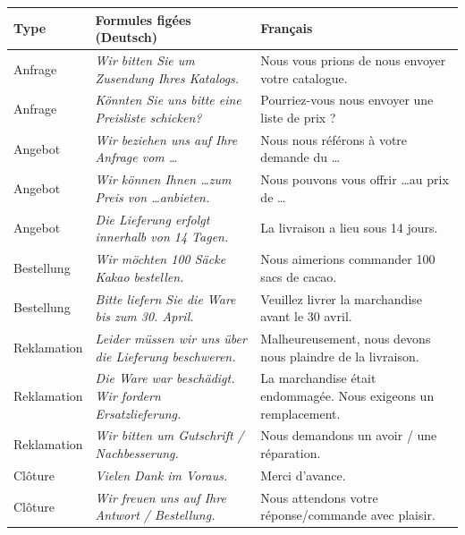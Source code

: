 \documentclass[11pt]{article}
\newcommand{\all}[1]{\ifmmode\text{\textit{#1}}\else\begingroup\selectlanguage{ngerman}\itshape #1\endgroup\fi}
\begin{document}
\begin{center}
\begin{tabularx}{\linewidth}{|l|X|X|}
\hline
\rowcolor{popblueL} \textbf{Type} & \textbf{Formules figées (Deutsch)} & \textbf{Français} \\
\hline
Anfrage & \all{Wir bitten Sie um Zusendung Ihres Katalogs.} & Nous vous prions de nous envoyer votre catalogue. \\
\hline
Anfrage & \all{Könnten Sie uns bitte eine Preisliste schicken?} & Pourriez-vous nous envoyer une liste de prix ? \\
\hline
Angebot & \all{Wir beziehen uns auf Ihre Anfrage vom \dots} & Nous nous référons à votre demande du \dots \\
\hline
Angebot & \all{Wir können Ihnen \dots zum Preis von \dots anbieten.} & Nous pouvons vous offrir \dots au prix de \dots \\
\hline
Angebot & \all{Die Lieferung erfolgt innerhalb von 14 Tagen.} & La livraison a lieu sous 14 jours. \\
\hline
Bestellung & \all{Wir möchten 100 Säcke Kakao bestellen.} & Nous aimerions commander 100 sacs de cacao. \\
\hline
Bestellung & \all{Bitte liefern Sie die Ware bis zum 30. April.} & Veuillez livrer la marchandise avant le 30 avril. \\
\hline
Reklamation & \all{Leider müssen wir uns über die Lieferung beschweren.} & Malheureusement, nous devons nous plaindre de la livraison. \\
\hline
Reklamation & \all{Die Ware war beschädigt. Wir fordern Ersatzlieferung.} & La marchandise était endommagée. Nous exigeons un remplacement. \\
\hline
Reklamation & \all{Wir bitten um Gutschrift / Nachbesserung.} & Nous demandons un avoir / une réparation. \\
\hline
Clôture & \all{Vielen Dank im Voraus.} & Merci d'avance. \\
\hline
Clôture & \all{Wir freuen uns auf Ihre Antwort / Bestellung.} & Nous attendons votre réponse/commande avec plaisir. \\
\hline
\end{tabularx}
\end{center}
\end{document}
